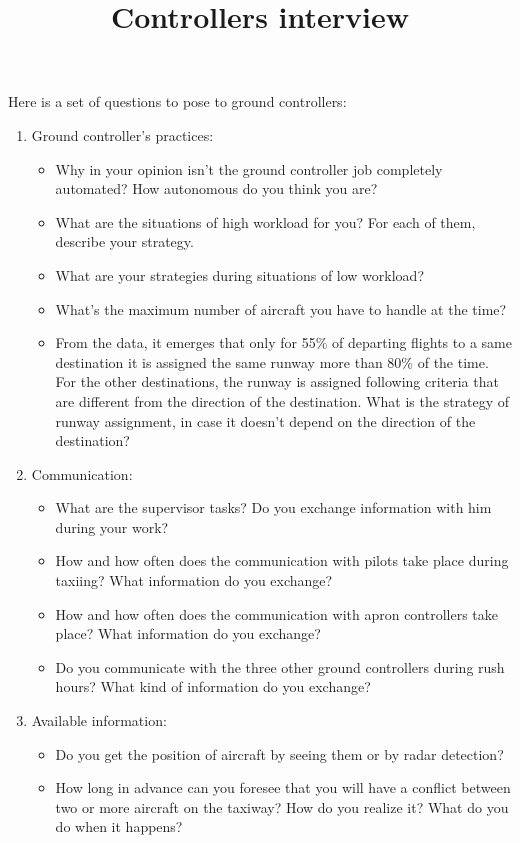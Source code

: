 \documentclass{article}
\begin{document}
		
	\title{Controllers interview}
	\maketitle
Here is a set of questions to pose to ground controllers:

\begin{enumerate}
    \item Ground controller's practices:
        \begin{itemize}
            \item Why in your opinion isn't the ground controller job completely automated? How autonomous do you think you are?
            \item What are the situations of high workload for you? For each of them, describe your strategy.
            \item What are your strategies during situations of low workload?
            \item What's the maximum number of aircraft you have to handle at the time?
            \item From the data, it emerges that only for 55\% of departing flights to a same destination it is assigned the same runway more than 80\% of the time. For the other destinations, the runway is assigned following criteria that are different from the direction of the destination. What is the strategy of runway assignment, in case it doesn't depend on the direction of the destination?
        \end{itemize}
    \item Communication:
        \begin{itemize}
            \item What are the supervisor tasks? Do you exchange information with him during your work?
            \item How and how often does the communication with pilots take place during taxiing? What information do you exchange?
            \item How and how often does the communication with apron controllers take place? What information do you exchange?
            \item Do you communicate with the three other ground controllers during rush hours? What kind of information do you exchange?
        \end{itemize}
        
    \item Available information:
        \begin{itemize}
            \item Do you get the position of aircraft by seeing them or by radar detection?
            \item How long in advance can you foresee that you will have a conflict between two or more aircraft on the taxiway? How do you realize it? What do you do when it happens?
        \end{itemize}
\end{enumerate}
\end{document}
